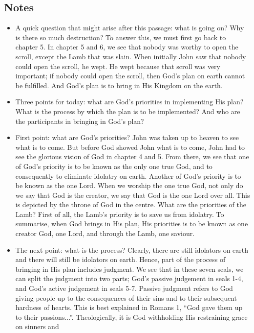 \subsection*{Notes}
\begin{itemize}
  \item{A quick question that might arise after this passage: what is going
  on?  Why is there so much destruction?  To answer this, we must first go
  back to chapter 5.  In chapter 5 and 6, we see that nobody was worthy to
  open the scroll, except the Lamb that was slain.  When initially John saw
  that nobody could open the scroll, he wept.  He wept because that scroll
  was very important; if nobody could open the scroll, then God's plan on
  earth cannot be fulfilled.  And God's plan is to bring in His Kingdom on
  the earth.  }
  \item{Three points for today: what are God's priorities in implementing His
  plan?  What is the process by which the plan is to be implemented?  And who
  are the participants in bringing in God's plan?}
  \item{First point: what are God's priorities?  John was taken up to heaven
  to see what is to come.  But before God showed John what is to come, John
  had to see the glorious vision of God in chapter 4 and 5.  From there, we
  see that one of God's priority is to be known as the only one true God, and
  to consequently to eliminate idolatry on earth.  Another of God's priority
  is to be known as the one Lord.  When we worship the one true God, not only
  do we say that God is the creator, we say that God is the one Lord over
  all.  This is depicted by the throne of God in the centre.  What are the
  priorities of the Lamb?  First of all, the Lamb's priority is to save us
  from idolatry.  To summarise, when God brings in His plan, His priorities
  is to be known as one creator God, one Lord, and through the Lamb, one
  saviour.}
  \item{The next point: what is the process?  Clearly, there are still
  idolators on earth and there will still be idolators on earth.  Hence,
  part of the process of bringing in His plan includes judgment.  We see that
  in these seven seals, we can split the judgment into two parts; God's
  passive judgement in seals 1-4, and God's active judgement in seals 5-7.
  Passive judgment refers to God giving people up to the consequences of
  their sins and to their subsequent hardness of hearts.  This is best
  explained in Romans 1, ``God gave them up to their passions...''.
  Theologically, it is God withholding His restraining grace on sinners and
}
\end{itemize}
